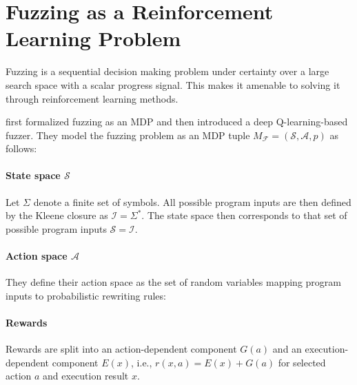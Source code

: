


\section{Fuzzing as a Reinforcement Learning Problem}\label{sec:rlfuzz-framing}

Fuzzing is a sequential decision making problem under certainty over a large search space
with a scalar progress signal.
This makes it amenable to solving it through reinforcement learning methods.

\textcite{bottinger_deep_2018} first formalized fuzzing as an MDP and then introduced
a deep Q-learning-based fuzzer.
They model the fuzzing problem as an MDP tuple $M_\mathcal{F}=(\mathcal{S},\mathcal{A},p)$
as follows:

\paragraph{State space $\mathcal{S}$}

Let $\Sigma$ denote a finite set of symbols. All possible program inputs are then
defined by the Kleene closure as $\mathcal{I}=\Sigma^*$. The state space then corresponds
to that set of possible program inputs $\mathcal{S}=\mathcal{I}$.

\paragraph{Action space $\mathcal{A}$}

They define their action space as the set of random variables mapping program inputs
to probabilistic rewriting rules:


\paragraph{Rewards}

Rewards are split into an action-dependent component $G(a)$ and an
execution-dependent component $E(x)$, i.e., $r(x,a)=E(x)+G(a)$ for selected
action $a$ and execution result $x$.

